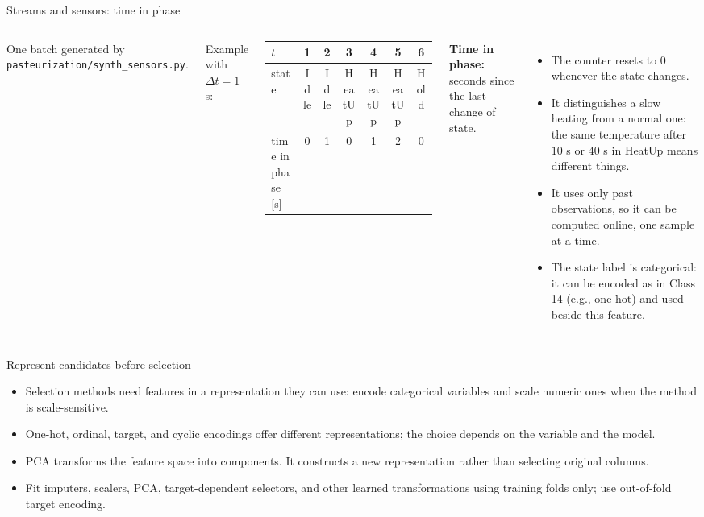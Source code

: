 \begin{frame}{Streams and sensors: time in phase}
\begin{columns}[T]
\centering
{}

{\tiny One batch generated by \texttt{pasteurization/synth\_sensors.py}.\par}
\vspace{0.3em}
\footnotesize Example with $\Delta t = 1$ s:\\[0.2em]
\begin{tabular}{l|cccccc}
$t$ & 1 & 2 & 3 & 4 & 5 & 6 \\
\hline
state & Idle & Idle & HeatUp & HeatUp & HeatUp & Hold \\
time in phase [s] & 0 & 1 & 0 & 1 & 2 & 0 \\
\end{tabular}
\footnotesize
\textbf{Time in phase:} seconds since the last change of state.
\begin{itemize}
\item The counter resets to $0$ whenever the state changes.
\item It distinguishes a slow heating from a normal one: the same temperature after $10$ s or $40$ s in HeatUp means different things.
\item It uses only past observations, so it can be computed online, one sample at a time.
\item The state label is categorical: it can be encoded as in Class 14 (e.g., one-hot) and used beside this feature.
\end{itemize}
\end{columns}
\coursefooter
\end{frame}
\begin{frame}{Represent candidates before selection}
\begin{itemize}
\item Selection methods need features in a representation they can use: encode categorical variables and scale numeric ones when the method is scale-sensitive.
\item One-hot, ordinal, target, and cyclic encodings offer different representations; the choice depends on the variable and the model.
\item PCA transforms the feature space into components. It constructs a new representation rather than selecting original columns.
\item Fit imputers, scalers, PCA, target-dependent selectors, and other learned transformations using training folds only; use out-of-fold target encoding.
\end{itemize}
\coursefooter
\end{frame}

